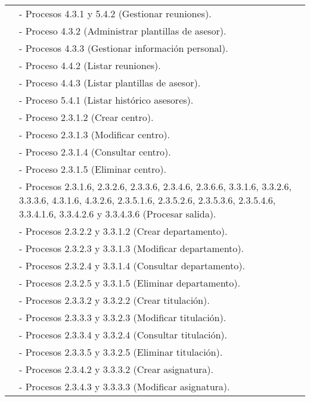 \begin{center}
\begin{longtable}{| l | p{9cm} |}
                          & - Procesos 4.3.1 y 5.4.2 (Gestionar reuniones).\\
                          & - Proceso 4.3.2 (Administrar plantillas de asesor).\\
                          & - Procesos 4.3.3 (Gestionar información personal).\\
                          & - Proceso 4.4.2 (Listar reuniones).\\
                          & - Proceso 4.4.3 (Listar plantillas de asesor).\\
                          & - Proceso 5.4.1 (Listar histórico asesores).\\
                          & - Proceso 2.3.1.2 (Crear centro).\\
                          & - Proceso 2.3.1.3 (Modificar centro).\\
                          & - Proceso 2.3.1.4 (Consultar centro).\\
                          & - Proceso 2.3.1.5 (Eliminar centro).\\
                          & - Procesos 2.3.1.6, 2.3.2.6, 2.3.3.6, 2.3.4.6,
                          2.3.6.6, 3.3.1.6, 3.3.2.6, 3.3.3.6, 4.3.1.6, 4.3.2.6,
                          2.3.5.1.6, 2.3.5.2.6, 2.3.5.3.6, 2.3.5.4.6,
                          3.3.4.1.6, 3.3.4.2.6 y 3.3.4.3.6 (Procesar salida).\\
                          & - Procesos 2.3.2.2 y 3.3.1.2 (Crear departamento).\\
                          & - Procesos 2.3.2.3 y 3.3.1.3 (Modificar departamento).\\
                          & - Procesos 2.3.2.4 y 3.3.1.4 (Consultar departamento).\\
                          & - Procesos 2.3.2.5 y 3.3.1.5 (Eliminar departamento).\\
                          & - Procesos 2.3.3.2 y 3.3.2.2 (Crear titulación).\\
                          & - Procesos 2.3.3.3 y 3.3.2.3 (Modificar titulación).\\
                          & - Procesos 2.3.3.4 y 3.3.2.4 (Consultar titulación).\\
                          & - Procesos 2.3.3.5 y 3.3.2.5 (Eliminar titulación).\\
                          & - Procesos 2.3.4.2 y 3.3.3.2 (Crear asignatura).\\
                          & - Procesos 2.3.4.3 y 3.3.3.3 (Modificar asignatura).\\

\end{longtable}
\end{center}
